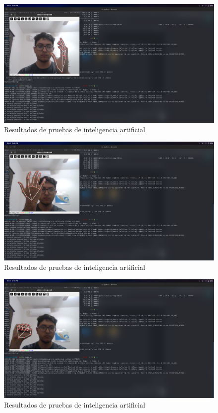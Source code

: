\begin{figure}[H]
    \centering
    \includegraphics[width=1\textwidth]{img/PruebaIA2.png}
    \caption{Resultados de pruebas de inteligencia artificial}
    \label{fig:ai-test}
\end{figure}

\begin{figure}[H]
    \centering
    \includegraphics[width=1\textwidth]{img/PruebaIA3.png}
    \caption{Resultados de pruebas de inteligencia artificial}
    \label{fig:ai-test}
\end{figure}

\begin{figure}[H]
    \centering
    \includegraphics[width=1\textwidth]{img/PruebaIA4.png}
    \caption{Resultados de pruebas de inteligencia artificial}
    \label{fig:ai-test}
\end{figure}

